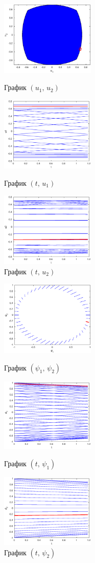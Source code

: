 \documentclass[11pt]{article}
\begin{document}
\begin{figure}[h]
\begin{multicols}{3}
	\hfill
	\includegraphics[width=45mm]{1uu.eps}
	\hfill
	\caption{График $(u_1, \, u_2)$}
	\hfill
	\includegraphics[width=45mm]{1tu1.eps}
	\hfill
	\caption{График $(t, \, u_1)$}
    \hfill
	\includegraphics[width=45mm]{1tu2.eps}
	\hfill
	\caption{График $(t, \, u_2)$}
\end{multicols}
\end{figure}		


\begin{figure}[h]
\begin{multicols}{3}
	\hfill
	\includegraphics[width=45mm]{1pp.eps}
	\hfill
	\caption{График $(\psi_1, \, \psi_2)$}
	\hfill
	\includegraphics[width=45mm]{1tp1.eps}
	\hfill
	\caption{График $(t, \, \psi_1)$}
    \hfill
	\includegraphics[width=45mm]{1tp2.eps}
	\hfill
	\caption{График $(t, \, \psi_2)$}
\end{multicols}
\end{figure}		
\end{document}
